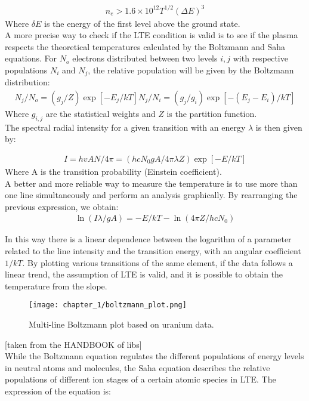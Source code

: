 \begin{align}
   n_{e}>1.6\times{10}^{12}T^{1/2}\left(\Delta E\right)^3 \label{eq:mcwhirter_criterion}  
\end{align}
Where $\delta E$ is the energy of the first level above the ground state.
\\
A more precise way to check if the LTE condition is valid is to see if the plasma respects the theoretical temperatures calculated by the Boltzmann and Saha equations. 
For $N_o$ electrons distributed between two levels $i,j$ with respective populations $N_i$ and $N_j$, the relative population will be given by the Boltzmann distribution:
\begin{align}
   N_j/N_{o}=\left(g_j/Z\right)\exp{\left[-E_j/kT\right]}N_j/N_i=\left(g_j/g_i\right)\exp{\left[-\left(E_j-E_i\right)/kT\right]} \label{eq:boltzmann_distribution}  
\end{align}
Where $g_{i,j}$ are the statistical weights and $Z$ is the partition function.
\\
The spectral radial intensity for a given transition with an energy $\lambda$ is then given by: 

\begin{align}
   I=hvAN/4\pi=\left(hcN_0gA/4\pi\lambda Z\right)\exp{\left[-E/kT\right]} \label{eq:spectral_radial_int}  
\end{align}
Where A is the transition probability (Einstein coefficient).
\\
A better and more reliable way to measure the temperature is to use more than one line simultaneously and perform an analysis graphically. By rearranging the previous expression, we obtain:
\begin{align}
   \ln{\left(I\lambda/gA\right)}=-E/kT-\ln{\left(4\pi Z/hcN_0\right)} \label{eq:bolzmann_plot_eq}  
\end{align}

In this way there is a linear dependence between the logarithm of a parameter related to the line intensity and the transition energy, with an angular coefficient $1/kT$. By plotting various transitions of the same element, if the data follows a linear trend, the assumption of LTE is valid, and it is possible to obtain the temperature from the slope.

\begin{figure}[H]
    \centering
    \texttt{[image: chapter\_1/boltzmann\_plot.png]}
    \caption{Multi-line Boltzmann plot based on uranium data.}
    \label{fig:boltzmann_plot_example}
\end{figure}
[taken from the HANDBOOK of libs]\\
While the Boltzmann equation regulates the different populations of energy levels in neutral atoms and molecules, the Saha equation describes the relative populations of different ion stages of a certain atomic species in LTE. The expression of the equation is:

